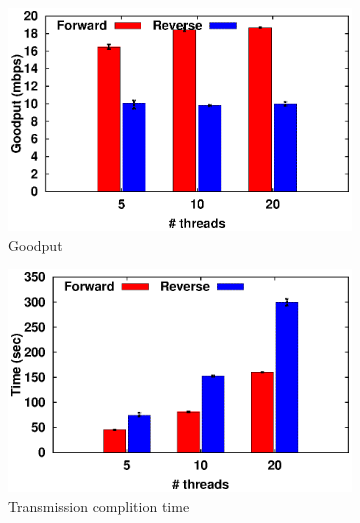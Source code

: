\begin{figure}[!t]
	\begin{center}
		\begin{subfigure}{.46\linewidth}
			\includegraphics[width=0.95\linewidth]{img/mpquic-prob/goodPut-5.eps}
			\caption{\label{fig:Goodput-mpquic}Goodput}
		\end{subfigure}
		\hspace{0.1cm}
		\begin{subfigure}{.46\linewidth}
			\caption{\label{fig:flowcomplition-mpquic}Transmission complition time}
			\includegraphics[width=0.95\linewidth]{img/mpquic-prob/tymdiff-5.eps}
		\end{subfigure}
		
		\caption{\label{fig:mpquic-back}}
	\end{center}
\end{figure}

